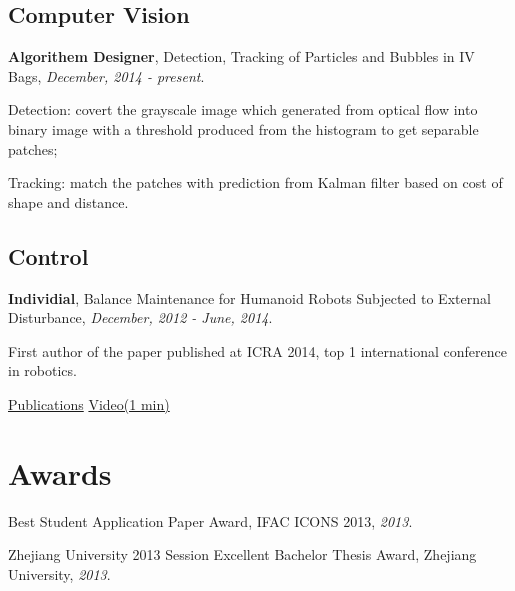 \documentclass[letterpaper]{article}
\renewenvironment{itemize}{
  \begin{list}{}{
    \setlength{\leftmargin}{1.5em}
  }
}{
  \end{list}
}
\begin{document}
\subsection*{Computer Vision}
\begin{itemize}
	\item[$\circ$] \textbf{Algorithem Designer}, Detection, Tracking of Particles and Bubbles in IV Bags,
	{\it December, 2014 - present}.
	\begin{itemize}
		\item Detection: covert the grayscale image which generated from optical flow into binary image with a threshold produced from the histogram to get separable patches; 
		\item Tracking: match the patches with prediction from Kalman filter based on cost of shape and distance.
	\end{itemize}
\end{itemize}

\subsection*{Control}
\begin{itemize}
	\item[$\circ$] \textbf{Individial}, Balance Maintenance for Humanoid Robots Subjected to External Disturbance, {\it December, 2012 - June, 2014}.
	\begin{itemize}
		\item First author of the paper published at ICRA 2014, top 1 international conference in robotics.
		\item \href{http://yaliang-wang.tk/publications/}{\color[rgb]{0.2, 0.7, 0.7} Publications} \hspace{0.2in} \href{http://yaliang-wang.tk/icra2014-video/}{\color[rgb]{0.2, 0.7, 0.7} Video(1 min)}
	\end{itemize}
\end{itemize}

\section*{Awards}

\begin{itemize}
  \item Best Student Application Paper Award, IFAC ICONS 2013, {\it  2013}.
  \item Zhejiang University 2013 Session Excellent Bachelor Thesis Award, Zhejiang University, {\it  2013}.
\end{itemize}
\end{document}
